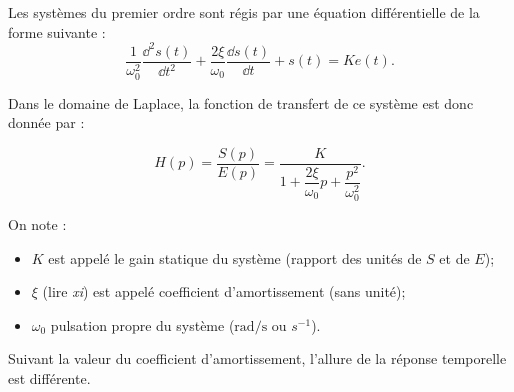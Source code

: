 \documentclass[10pt,fleqn]{article} %
\begin{document}
\begin{defi}

Les systèmes du premier ordre sont régis par une équation différentielle de la
forme suivante :
$$
\dfrac{1}{\omega_0^2} \dfrac{\dd^2 s(t)}{\dd t^2}+\dfrac{2\xi}{\omega_0} \dfrac{\dd s(t)}{\dd t}+s(t) = Ke(t).
$$

Dans le domaine de Laplace, la fonction de transfert de ce système est donc
donnée par :

\begin{minipage}[c]{.6\linewidth}
$$
H(p)=\dfrac{S(p)}{E(p)} = \dfrac{K}{1+ \dfrac{2\xi}{\omega_0}p+\dfrac{p^2}{\omega_0^2}}.
$$
\end{minipage}\hfill
\begin{minipage}[c]{.35\linewidth}

\begin{center}
\end{center}
\end{minipage}


On note :
\begin{itemize}
\item $K$ est appelé le gain statique du système (rapport des unités de $S$ et de $E$);
\item $\xi$ (lire \textit{xi}) est appelé coefficient d'amortissement (sans unité);
\item $\omega_0$ pulsation propre du système ($\text{rad/s}$ ou $s^{-1}$).
\end{itemize}


Suivant la valeur du coefficient d'amortissement, l'allure de la réponse temporelle est différente.
\end{defi}
\end{document}
